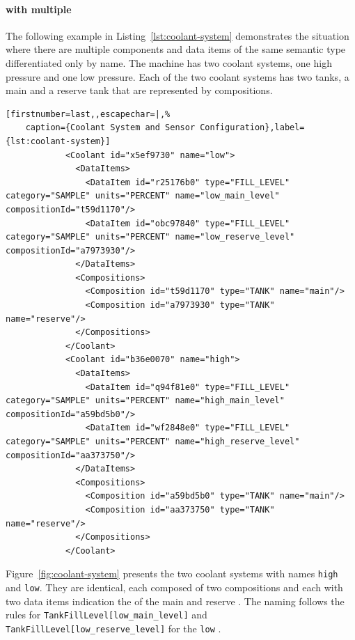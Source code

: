 \FloatBarrier

\paragraph{  with multiple }

The following example in Listing~\ref{lst:coolant-system} demonstrates the situation where there are multiple components and data items of the same semantic type differentiated only by name. The machine has two coolant systems, one high pressure and one low pressure. Each of the two coolant systems has two tanks, a main and a reserve tank that are represented by compositions. 

\begin{lstlisting}[firstnumber=last,,escapechar=|,%
    caption={Coolant System and Sensor Configuration},label={lst:coolant-system}]
            <Coolant id="x5ef9730" name="low">
              <DataItems>
                <DataItem id="r25176b0" type="FILL_LEVEL" category="SAMPLE" units="PERCENT" name="low_main_level" compositionId="t59d1170"/>
                <DataItem id="obc97840" type="FILL_LEVEL" category="SAMPLE" units="PERCENT" name="low_reserve_level" compositionId="a7973930"/>
              </DataItems>
              <Compositions>
                <Composition id="t59d1170" type="TANK" name="main"/>
                <Composition id="a7973930" type="TANK" name="reserve"/>
              </Compositions>
            </Coolant>
            <Coolant id="b36e0070" name="high">
              <DataItems>
                <DataItem id="q94f81e0" type="FILL_LEVEL" category="SAMPLE" units="PERCENT" name="high_main_level" compositionId="a59bd5b0"/>
                <DataItem id="wf2848e0" type="FILL_LEVEL" category="SAMPLE" units="PERCENT" name="high_reserve_level" compositionId="aa373750"/>
              </DataItems>
              <Compositions>
                <Composition id="a59bd5b0" type="TANK" name="main"/>
                <Composition id="aa373750" type="TANK" name="reserve"/>
              </Compositions>
            </Coolant>
\end{lstlisting}

Figure~\ref{fig:coolant-system} presents the two coolant systems with names \texttt{high} and \texttt{low}. They are identical, each composed of two  compositions and each with two data items indication the  of the main and reserve . The naming follows the rules for \texttt{TankFillLevel[low_main_level]} and \texttt{TankFillLevel[low_reserve_level]} for the \texttt{low} . 

